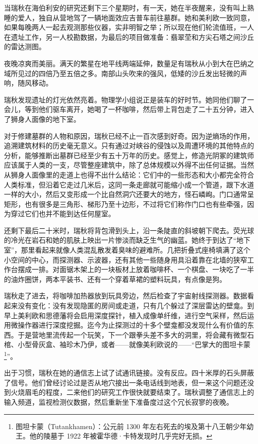 \documentclass[AutoFakeBold=true]{book}
\begin{document}
当瑞秋在海伯利安的研究还剩下三个星期时，有一天，她在半夜醒来，没有叫上熟睡的爱人，独自从营地驾了一辆地面效应吉普车前往墓群。她和美利欧一致同意，如果每晚两人一起去观测那些仪器，实非明智之举；所以现在他们轮流值班，一人在遗址工作，另一人校勘数据，为最后的项目做准备：翡翠茔和方尖石塔之间沙丘的雷达测图。

夜晚凉爽而美丽。满天的繁星在地平线两端延伸，数量足有瑞秋从小到大在巴纳之域所见过的四倍乃至五倍之多。南部山头吹来的强风，低矮的沙丘发出轻微的声响，随风移动。

瑞秋发现遗址的灯光依然亮着。物理学小组说正是装车的好时节。她同他们聊了一会儿，等到他们驱车离开，她喝了一杯咖啡，然后带上背包走了二十五分钟，进入了狮身人面像的地下室。

对于修建墓群的人物和原因，瑞秋已经不止一百次感到好奇。因为逆熵场的作用，追溯建筑材料的历史毫无意义。只有通过对峡谷的侵蚀以及周遭环境的其他特点的分析，能够推断出墓群已经至少有五十万年的历史。感觉上，修造光阴冢的建筑师应该属于人类的一支，尽管整座建筑中，除了总体规模以外得不出任何证据。当然从狮身人面像里的走道上也得不出什么结论：它们中的一些形态和大小都完全符合人类标准，但沿着它走过几米后，这同一条走廊就可能缩小成一个管道，跟下水道一样的大小，然后又变形成一个比自然洞穴还要大的地方，怪石嶙峋。门口通常呈矩形，也有很多是三角形、梯形乃至十边形，不过将它们称作门口也有些牵强，因为穿过它们也并不能到达任何屋室。

还剩下最后二十米时，瑞秋将背包滑到头上，沿一条陡直的斜坡朝下爬去。荧光球的冷光在岩石和她的肌肤上映出一片惨淡而缺乏生气的幽蓝。她终于到达了``地下室''，那里看起来就像人类混乱散发着臭味的避难所。几把折叠式座椅填满了这个小空间的中心，而探测器、示波器，还有其他一些随身用具沿着靠在北墙的狭窄工作台摆成一排。对面锯木架上的一块板材上放着咖啡杯、一个棋盘、一块吃了一半的油炸圈饼，两本平装书、还有一个穿着草裙的塑料玩具，有点像是狗。

瑞秋走了进去，将咖啡加热器放到玩具旁边，然后检查了宇宙射线探测器。数据看起来没有变化：没有发现隐匿的房间或走道，只有几个躲过了深层雷达的壁龛。到早上美利欧和思德藩将会启用深度探针，植入成像单纤维，进行空气采样，然后运用微操作器进行深度挖掘。迄今为止探测过的十多个壁龛都没发现什么有价值的东西。于是营地里流传起一个玩笑，下一个跟拳头差不多大的洞里，将会藏有微型石棺、小型骨灰盒、袖珍木乃伊，或者——就像美利欧说的——``巴掌大的图坦卡蒙\footnote{图坦卡蒙（Tutankhamen）：公元前 1300 年左右死去的埃及第十八王朝少年幼王。他的陵墓于 1922 年被霍华德·卡特发现时几乎完好无损。}''。

出于习惯，瑞秋在她的通信志上试了试通讯链接。没有反应。四十米厚的石头屏蔽了信号。他们曾经讨论过是否从地穴接出一条电话线到地表，但一来这个问题还没到火烧眉毛的程度，二来他们的研究工作很快就要结束了。瑞秋调整了通信志上的输入频道，监视检测仪数据，然后重新坐下准备度过这个冗长寂寥的夜晚。
\end{document}
